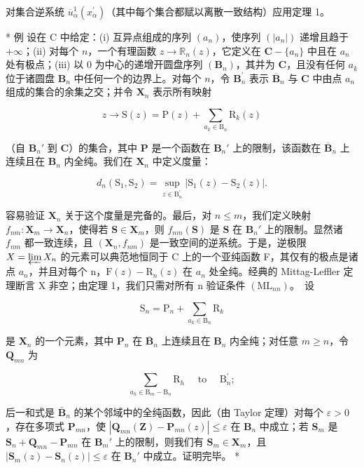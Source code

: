 对集合逆系统 \(\overline{u}_{\alpha}^{1}(x_{\alpha}^{\prime})\)（其中每个集合都赋以离散一致结构）应用定理 1。

* 例 设在 C 中给定：(i) 互异点组成的序列 \((a_{n})\)，使序列 \((|a_{n}|)\) 递增且趋于 \(+\infty\)；(ii) 对每个 \(n\)，一个有理函数 \(z \to \mathbb{R}_{n}(z)\)，它定义在 \(\mathbf{C} - \{a_{n}\}\) 中且在 \(a_{n}\) 处有极点；(iii) 以 0 为中心的递增开圆盘序列 \((\mathbf{B}_{n})\)，其并为 \(\mathbf{C}\)，且没有任何 \(a_{k}\) 位于诸圆盘 \(\mathbf{B}_{n}\) 中任何一个的边界上。对每个 \(n\)，令 \(\mathbf{B}_{n}^{\prime}\) 表示 \(\overline{\mathbf{B}}_{n}\) 与 \(\mathbf{C}\) 中由点 \(a_{n}\) 组成的集合的余集之交；并令 \(\mathbf{X}_{n}\) 表示所有映射

\[
z \rightarrow \mathrm{S} (z) = \mathrm{P} (z) + \sum_ {a _ {k} \in \mathrm{B} _ {n}} \mathrm{R} _ {k} (z)
\]

（自 \(\mathbf{B}_n'\) 到 \(\mathbf{C}\)）的集合，其中 \(\mathbf{P}\) 是一个函数在 \(\mathbf{B}_n'\) 上的限制，该函数在 \(\overline{\mathbf{B}}_n\) 上连续且在 \(\mathbf{B}_n\) 内全纯。我们在 \(\mathbf{X}_n\) 中定义度量：

\[
d _ {n} \left(\mathrm{S} _ {1}, \mathrm{S} _ {2}\right) = \sup _ {z \in \mathrm{B} _ {n} ^ {\prime}} | \mathrm{S} _ {1} (z) - \mathrm{S} _ {2} (z) |.
\]

容易验证 \(\mathbf{X}_n\) 关于这个度量是完备的。最后，对 \(n \leqslant m\)，我们定义映射 \(f_{nm}: \mathbf{X}_m \to \mathbf{X}_n\)，使得若 \(\mathbf{S} \in \mathbf{X}_m\)，则 \(f_{nm}(\mathbf{S})\) 是 \(\mathbf{S}\) 在 \(\mathbf{B}_n'\) 上的限制。显然诸 \(f_{nm}\) 都一致连续，且 \((\mathbf{X}_n, f_{nm})\) 是一致空间的逆系统。于是，逆极限 \(X = \varprojlim X_{n}\) 的元素可以典范地恒同于 C 上的一个亚纯函数 F，其仅有的极点是诸点 \(a_{n}\)，并且对每个 n，\(\mathrm{F}(z) - \mathrm{R}_{n}(z)\) 在 \(a_{n}\) 处全纯。经典的 Mittag-Leffler 定理断言 X 非空；由定理 1，我们只需对所有 n 验证条件 \((\mathrm{ML}_{nn})\)。~设

\[
\mathrm{S} _ {n} = \mathrm{P} _ {n} + \sum_ {a _ {k} \in \mathrm{B} _ {n}} \mathrm{R} _ {k}
\]

是 \(\mathbf{X}_n\) 的一个元素，其中 \(\mathbf{P}_n\) 在 \(\overline{\mathbf{B}}_n\) 上连续且在 \(\mathbf{B}_n\) 内全纯；对任意 \(m \geqslant n\)，令 \(\mathbf{Q}_{mn}\) 为

\[
\sum_ {a _ {h} \in \mathrm{B} _ {m} - \mathrm{B} _ {n}} \mathrm{R} _ {h} \quad \text { to } \quad \mathrm{B} _ {n} ^ {\prime};
\]

后一和式是 \(\bar{\mathbf{B}}_n\) 的某个邻域中的全纯函数，因此（由 Taylor 定理）对每个 \(\varepsilon > 0\)，存在多项式 \(\mathbf{P}_{mn}\)，使 \(|\mathbf{Q}_{mn}(\mathbf{Z}) - \mathbf{P}_{mn}(z)| \leqslant \varepsilon\) 在 \(\mathbf{B}_n\) 中成立；若 \(\mathbf{S}_m\) 是 \(\mathbf{S}_n + \mathbf{Q}_{mn} - \mathbf{P}_{mn}\) 在 \(\mathbf{B}_m'\) 上的限制，则我们有 \(\mathbf{S}_m \in \mathbf{X}_m\)，且 \(|\mathbf{S}_m(z) - \mathbf{S}_n(z)| \leqslant \varepsilon\) 在 \(\mathbf{B}_n'\) 中成立。证明完毕。 *

